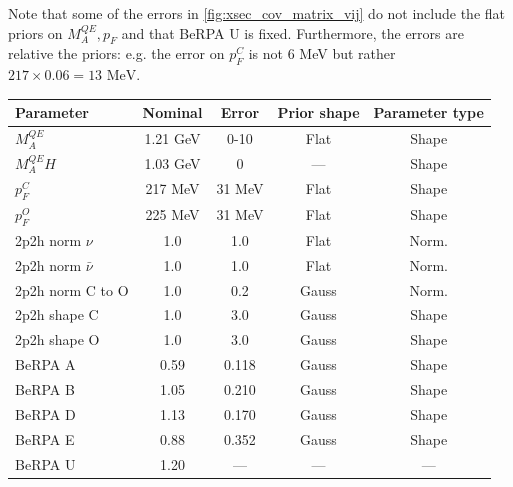 Note that some of the errors in \autoref{fig:xsec_cov_matrix_vij} do not include the flat priors on $M_A^{QE}, p_F$ and that BeRPA U is fixed. Furthermore, the errors are relative the priors: e.g. the error on $p_F^C$ is not 6 MeV but rather $217\times0.06=13\text{ MeV}$.

\begin{table}
	\begin{tabular}{l | c c c c }
		\hline
		\hline
		Parameter & Nominal & Error & Prior shape & Parameter type \\
		\hline
		$M_A^{QE}$ & 1.21 GeV & 0-10 & Flat & Shape \\
		$M_A^{QE} H$ & 1.03 GeV & 0 & --- & Shape \\
		$p_F^C$ & 217 MeV & 31 MeV & Flat & Shape \\
		$p_F^O$ & 225 MeV & 31 MeV & Flat & Shape \\
		2p2h norm $\nu$ & 1.0 & 1.0 & Flat & Norm. \\
		2p2h norm $\bar{\nu}$ & 1.0 & 1.0 & Flat & Norm. \\
		2p2h norm C to O & 1.0 & 0.2 & Gauss & Norm. \\
		2p2h shape C & 1.0 & 3.0 & Gauss & Shape \\
		2p2h shape O & 1.0 & 3.0 & Gauss & Shape \\ 
		BeRPA A & 0.59 & 0.118 & Gauss & Shape \\
		BeRPA B & 1.05 & 0.210 & Gauss & Shape \\
		BeRPA D & 1.13 & 0.170 & Gauss & Shape \\
		BeRPA E & 0.88 & 0.352 & Gauss & Shape \\
		BeRPA U & 1.20 & --- & --- & --- \\
		\hline
		
		\hline
		\hline
	\end{tabular}
\end{table}
